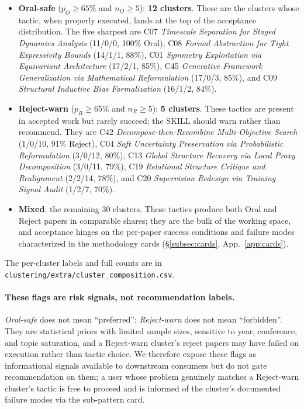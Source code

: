 \documentclass[10pt,a4paper]{article}
\begin{document}
\begin{itemize}[leftmargin=1.4em, topsep=2pt, itemsep=2pt]
\item \textbf{Oral-safe} ($p_O \geq 65\%$ and $n_O \geq 5$): \textbf{12 clusters}. These are the clusters whose tactic, when properly executed, lands at the top of the acceptance distribution. The five sharpest are C07 \emph{Timescale Separation for Staged Dynamics Analysis} (11/0/0, 100\% Oral), C08 \emph{Formal Abstraction for Tight Expressivity Bounds} (14/1/1, 88\%), C01 \emph{Symmetry Exploitation via Equivariant Architecture} (17/2/1, 85\%), C45 \emph{Generative Framework Generalization via Mathematical Reformulation} (17/0/3, 85\%), and C09 \emph{Structural Inductive Bias Formalization} (16/1/2, 84\%).
\item \textbf{Reject-warn} ($p_R \geq 65\%$ and $n_R \geq 5$): \textbf{5 clusters}. These tactics are present in accepted work but rarely succeed; the SKILL should warn rather than recommend. They are C42 \emph{Decompose-then-Recombine Multi-Objective Search} (1/0/10, 91\% Reject), C04 \emph{Soft Uncertainty Preservation via Probabilistic Reformulation} (3/0/12, 80\%), C13 \emph{Global Structure Recovery via Local Proxy Decomposition} (3/0/11, 79\%), C19 \emph{Relational Structure Critique and Realignment} (2/2/14, 78\%), and C20 \emph{Supervision Redesign via Training Signal Audit} (1/2/7, 70\%).
\item \textbf{Mixed}: the remaining 30 clusters. These tactics produce both Oral and Reject papers in comparable shares; they are the bulk of the working space, and acceptance hinges on the per-paper success conditions and failure modes characterized in the methodology cards (\S\ref{subsec:cards}, App.~\ref{app:cards}).
\end{itemize}

The per-cluster labels and full counts are in \texttt{clustering/extra/cluster\_composition.csv}.

\paragraph{These flags are risk signals, not recommendation labels.} \emph{Oral-safe} does not mean ``preferred''; \emph{Reject-warn} does not mean ``forbidden''. They are statistical priors with limited sample sizes, sensitive to year, conference, and topic saturation, and a Reject-warn cluster's reject papers may have failed on execution rather than tactic choice. We therefore expose these flags as informational signals available to downstream consumers but do not gate recommendation on them; a user whose problem genuinely matches a Reject-warn cluster's tactic is free to proceed and is informed of the cluster's documented failure modes via the sub-pattern card.
\end{document}
